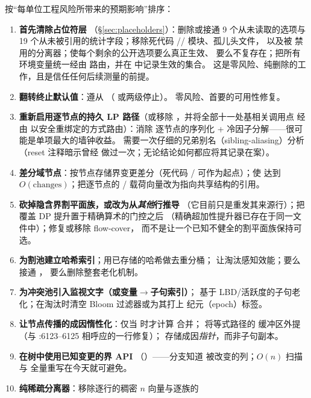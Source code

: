 \documentclass[11pt]{ctexart}
\begin{document}
按“每单位工程风险所带来的预期影响”排序：
\begin{enumerate}[nosep]
\item \textbf{首先清除占位符层}
  （\S\ref{sec:placeholders}）：删除或接通 9 个从未读取的选项与 19
  个从未被引用的统计字段；移除死代码
  // 模块、孤儿头文件，
  以及被  禁用的分离器；使每个剩余的公开选项要么真正生效、
  要么不复存在；把所有环境变量统一经由
   路由，并在  中记录生效的集合。
  这是零风险、纯删除的工作，且是信任任何后续测量的前提。
\item \textbf{翻转终止默认值}：遵从 
  （ 或两级停止）。
  零风险、首要的可用性修复。
\item \textbf{重新启用逐节点的持久 LP 路径}（或移除
  ，并将全部十一处基相关调用点
  经由  以安全重绑定的方式路由）：消除
  逐节点的序列化 + 冷因子分解——很可能是单项最大的墙钟收益。
  需要一次仔细的兄弟别名（sibling-aliasing）分析（reset 注释暗示曾经
  做过一次；无论结论如何都应将其记录在案）。
\item \textbf{差分域节点}：按节点存储界变更差分（死代码
  / 可作为起点）；使
   达到 $O(\text{changes})$；把逐节点的 /
  载荷向量改为指向共享结构的引用。
\item \textbf{砍掉隐含界割平面族，或改为从\emph{其他}行推导}
  （它目前只是重发其来源行）；把覆盖 DP 提升置于精确算术的门控之后
  （精确超加性提升器已存在于同一文件中）；修复或移除 flow-cover，
  而不是让一个已知不健全的割平面族保持可选。
\item \textbf{为割池建立哈希索引}；用已存储的哈希做去重分桶；
  让淘汰感知效能；要么接通 ，
  要么删除整套老化机制。
\item \textbf{为冲突池引入监视文字（或变量$\to$子句索引）}；
  基于 LBD/活跃度的子句老化；在淘汰时清空 Bloom 过滤器或为其打上
  纪元（epoch）标签。
\item \textbf{让节点传播的成因惰性化}：仅当
   时才计算  合并；
  将等式路径的  缓冲区外提（与 :6123--6125 相呼应的一行修复）；
  存储成因\emph{指针}，而非子句副本。
\item \textbf{在树中使用已知变更的界 API}
  （）——分支知道
  被改变的列；$O(n)$ 扫描与  全量重写在今天就可避免。
\item \textbf{纯稀疏分离器}：移除逐行的稠密 $n$ 向量与逐族的

\end{enumerate}
\end{document}
